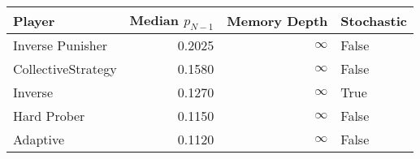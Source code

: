 \begin{tabular}{lrrl}
\toprule
             Player &  Median $p_{N-1}$ &  Memory Depth & Stochastic \\
\midrule
   Inverse Punisher &            0.2025 &            \(\infty\) &      False \\
 CollectiveStrategy &            0.1580 &            \(\infty\) &      False \\
            Inverse &            0.1270 &            \(\infty\) &       True \\
        Hard Prober &            0.1150 &            \(\infty\) &      False \\
           Adaptive &            0.1120 &            \(\infty\) &      False \\
\bottomrule
\end{tabular}
